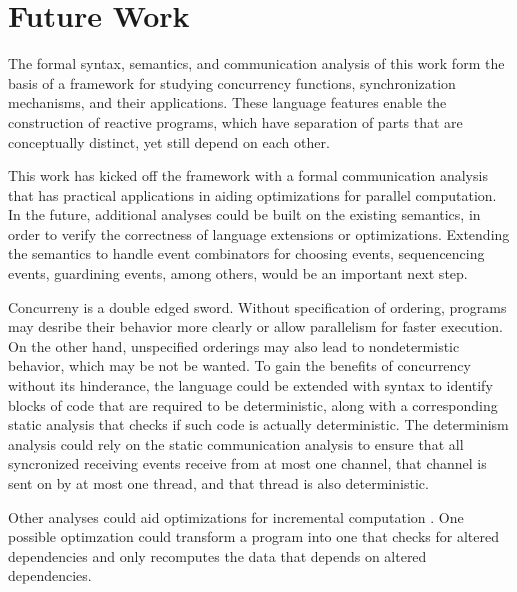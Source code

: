 \documentclass[letterpaper, 11pt]{extarticle}
\begin{document}
\section{Future Work}
The formal syntax, semantics, and communication analysis of this work form the basis of
a framework for studying concurrency functions, synchronization mechanisms, and their
applications. These language features enable the construction of reactive programs, which
have separation of parts that are conceptually distinct, yet still depend on each
other.

This work has kicked off the framework with a formal communication analysis that has practical
applications in aiding optimizations for parallel computation. In the future, additional
analyses could be built on the existing semantics, in order to verify the correctness of language 
extensions or optimizations. Extending the semantics to handle event combinators for choosing
events, sequencencing events, guardining events, among others, would be an important next step.

Concurreny is a double edged sword. Without specification of ordering, programs may
desribe their behavior more clearly or allow parallelism for faster execution. On the other hand,
unspecified orderings may also lead to nondetermistic behavior, which may be not be wanted. 
To gain the benefits of concurrency without its hinderance, the language could be extended
with syntax to identify blocks of code that are required to be deterministic,
along with a corresponding static analysis that checks if such code is actually
deterministic. The determinism analysis could rely on the static communication analysis
to ensure that all syncronized receiving events receive from at most one channel,
that channel is sent on by at most one thread, and that thread is also deterministic.

Other analyses could aid optimizations for incremental computation
\cite{acar2002adaptive}. One possible optimzation could transform a program into one
that checks for altered dependencies and only recomputes the data that depends on altered dependencies.

\newpage



\end{document}
